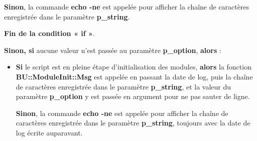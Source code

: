 \documentclass[a4paper,10pt]{article}
\begin{document}
\begin{itemize}
{\begin{itemize}
{\begin{itemize}
{                        \setlength{\parskip}{1em}

                        \begin{justify}
                            \textbf{\color{cond}Sinon}, la commande \textbf{\color{cmds}echo -ne} est appelée pour afficher la chaîne de caractères enregistrée dans le paramètre \textbf{\color{vars}p\_string}.
                        \end{justify}

                        \begin{justify}
                            \textbf{\color{cond}Fin de la condition « if »}.
                    \end{justify}
                    }
                \end{itemize}

                \item
                {
                    \setlength{\parskip}{2em}

                    \begin{justify}
                        \textbf{\color{case}Sinon, si} aucune valeur n'est passée au paramètre \textbf{\color{vars}p\_option}, \textbf{\color{case}alors} :
                    \end{justify}

                    \setlength{\parskip}{1em}
                }

                \begin{itemize}
                    \item
                    {
                        \begin{justify}
                            \textbf{\color{cond}Si} le script est en pleine étape d'initialisation des modules, \textbf{\color{cond}alors} la fonction \textbf{\color{func}BU::ModuleInit::Msg} est appelée en passant la date de log, puis la chaîne de caractères enregistrée dans le paramètre \textbf{\color{vars}p\_string}, et la valeur du paramètre \textbf{\color{vars}p\_option} y est passée en argument pour ne pas sauter de ligne.
                        \end{justify}

                        \setlength{\parskip}{1em}

                        \begin{justify}
                            \textbf{\color{cond}Sinon}, la commande \textbf{\color{cmds}echo -ne} est appelée pour afficher la chaîne de caractères enregistrée dans le paramètre \textbf{\color{vars}p\_string}, toujours avec la date de log écrite auparavant.
                        \end{justify}

}
\end{itemize}}
\end{itemize}}
\end{itemize}
\end{document}
